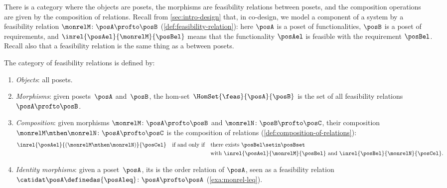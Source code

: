 \begin{example}
    \label{exa:the-category-of-feasibility-relations}
    There is a category where the objects are posets, the morphisms are feasibility relations between posets, and the composition operations are given by the composition of relations.
    Recall from \cref{sec:intro-design} that, in co-design, we model a component of a system by a feasibility relation $\monrelM \colon \posA \profto \posB$ (\cref{def:feasibility-relation}): here $\posA$ is a poset of functionalities, $\posB$ is a poset of requirements, and $\inrel{\posAel}{\monrelM}{\posBel}$ means that the functionality $\posAel$ is feasible with the requirement $\posBel$.
    Recall also that a feasibility relation is the same thing as a  between posets.

    \begin{ctdefinition}
    \label{def:Feas}
    The category \feas of feasibility relations is defined by:
    \begin{enumerate}
        \item \emph{Objects}: all posets.
        \item \emph{Morphisms}: given posets~$\posA$ and~$\posB$, the hom-set~$\HomSet{\feas}{\posA}{\posB}$ is the set of all feasibility relations $\posA \profto \posB$.
        \item \emph{Composition}: given morphisms $\monrelM \colon \posA \profto \posB$ and $\monrelN \colon \posB \profto \posC$, their composition $\monrelM \mthen \monrelN \colon \posA \profto \posC$ is the composition of relations (\cref{def:composition-of-relations}):
              \begin{equation}
                  \label{eq:Feas-composition}
                  \begin{aligned}
                      \inrel{\posAel}{(\monrelM \mthen \monrelN)}{\posCel}
                      \quad \text{if and only if} \quad
                       & \text{there exists } \posBel \setin \posBset \\
                       & \text{with } \inrel{\posAel}{\monrelM}{\posBel} \text{ and } \inrel{\posBel}{\monrelN}{\posCel}.
                  \end{aligned}
              \end{equation}
        \item \emph{Identity morphisms}: given a poset~$\posA$, its  is the order relation of $\posA$, seen as a feasibility relation $\catidat\posA \definedas {\posAleq} \colon \posA \profto \posA$ (\cref{exa:monrel-leq}).
    \end{enumerate}
\end{ctdefinition}


\end{example}

